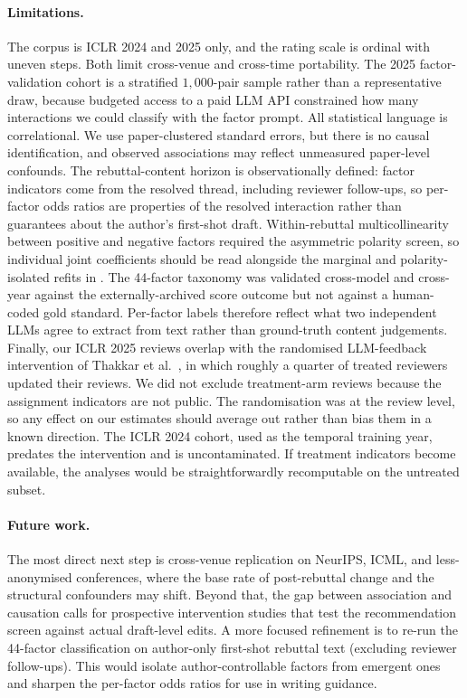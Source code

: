 \documentclass{article}
\begin{document}
\paragraph{Limitations.} The corpus is ICLR 2024 and 2025 only, and the rating scale is ordinal with uneven steps. Both limit cross-venue and cross-time portability. The 2025 factor-validation cohort is a stratified $1{,}000$-pair sample rather than a representative draw, because budgeted access to a paid LLM API constrained how many interactions we could classify with the factor prompt. All statistical language is correlational. We use paper-clustered standard errors, but there is no causal identification, and observed associations may reflect unmeasured paper-level confounds. The rebuttal-content horizon is observationally defined: factor indicators come from the resolved thread, including reviewer follow-ups, so per-factor odds ratios are properties of the resolved interaction rather than guarantees about the author's first-shot draft. Within-rebuttal multicollinearity between positive and negative factors required the asymmetric polarity screen, so individual joint coefficients should be read alongside the marginal and polarity-isolated refits in . The 44-factor taxonomy was validated cross-model and cross-year against the externally-archived score outcome but not against a human-coded gold standard. Per-factor labels therefore reflect what two independent LLMs agree to extract from text rather than ground-truth content judgements. Finally, our ICLR 2025 reviews overlap with the randomised LLM-feedback intervention of Thakkar et al.~\cite{thakkar}, in which roughly a quarter of treated reviewers updated their reviews. We did not exclude treatment-arm reviews because the assignment indicators are not public. The randomisation was at the review level, so any effect on our estimates should average out rather than bias them in a known direction. The ICLR 2024 cohort, used as the temporal training year, predates the intervention and is uncontaminated. If treatment indicators become available, the analyses would be straightforwardly recomputable on the untreated subset.

\paragraph{Future work.} The most direct next step is cross-venue replication on NeurIPS, ICML, and less-anonymised conferences, where the base rate of post-rebuttal change and the structural confounders may shift. Beyond that, the gap between association and causation calls for prospective intervention studies that test the recommendation screen against actual draft-level edits. A more focused refinement is to re-run the 44-factor classification on author-only first-shot rebuttal text (excluding reviewer follow-ups). This would isolate author-controllable factors from emergent ones and sharpen the per-factor odds ratios for use in writing guidance.
\end{document}
